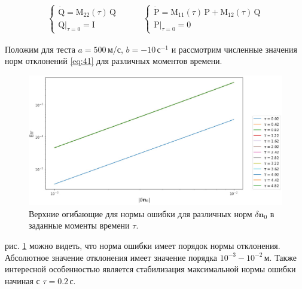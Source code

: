 \documentclass[12pt, cleqn, a4paper]{article}
\newcommand{\bfv}[1]{\mathbf{#1}}
\newcommand{\dd}[1]{\dot{#1}}
\newcommand{\dn}{\delta \bfv{n}}
\newcommand{\matr}[1]{\mathrm{#1}}
\begin{document}
\begin{align*}
\begin{cases}
\dd{\matr{Q}} = \matr{M}_{22}(\tau)\,\matr{Q}\\
\matr{Q}|_{\tau=0} = \matr{I}
\end{cases}   
\quad & \quad   
\begin{cases}
\dd{\matr{P}} = \matr{M}_{11}(\tau)\,\matr{P} + \matr{M}_{12}(\tau)\,\matr{Q}\\
\matr{P}|_{\tau=0} = \matr{0}
\end{cases} 
\end{align*}

Положим для теста $a = 500$\,м/с, $b = -10$\,$\text{с}^{-1}$ и рассмотрим численные значения норм отклонений \eqref{eq:41} для различных моментов времени.

\begin{figure}[H] 
\centering
\includegraphics[width=1.0\linewidth]{errline_lin.eps}
\caption{Верхние огибающие для нормы ошибки для различных норм $\dn_0$ в заданные моменты времени $\tau$.}
\label{fig:errline_lin}
\end{figure}

 рис. \ref{fig:errline_lin} можно видеть, что норма ошибки имеет порядок нормы отклонения. Абсолютное значение отклонения имеет значение порядка $10^{-3}-10^{-2}$\,м. Также интересной особенностью является стабилизация максимальной нормы ошибки начиная с $\tau = 0.2$\,с.\\
\end{document}

